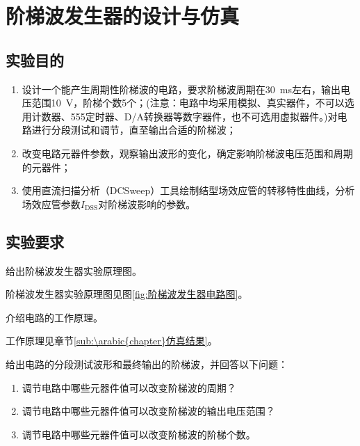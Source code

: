 \chapter{阶梯波发生器的设计与仿真}%
\label{cha:阶梯波发生器的设计与仿真}

\section{实验目的}%
\label{sec:\arabic{chapter}实验目的}

\begin{enumerate}
	\item 设计一个能产生周期性阶梯波的电路，要求阶梯波周期在\SI{30}{\ms}左右，输出电压范围\SI{10}{\V}，阶梯个数5个；(注意：电路中均采用模拟、真实器件，不可以选用计数器、555定时器、D/A转换器等数字器件，也不可选用虚拟器件。)对电路进行分段测试和调节，直至输出合适的阶梯波；
	\item 改变电路元器件参数，观察输出波形的变化，确定影响阶梯波电压范围和周期的元器件；
	\item 使用直流扫描分析（DCSweep）工具绘制结型场效应管的转移特性曲线，分析场效应管参数$ I_\mathrm{DSS} $对阶梯波影响的参数。
\end{enumerate}

\section{实验要求}%
\label{sec:\arabic{chapter}实验要求}

\begin{Exercise}
	给出阶梯波发生器实验原理图。
\end{Exercise}

\begin{Answer}
	阶梯波发生器实验原理图见图\ref{fig:阶梯波发生器电路图}。
\end{Answer}

\begin{Exercise}
	介绍电路的工作原理。
\end{Exercise}

\begin{Answer}
	工作原理见章节\ref{sub:\arabic{chapter}仿真结果}。
\end{Answer}

\begin{Exercise}
	给出电路的分段测试波形和最终输出的阶梯波，并回答以下问题：
	\begin{enumerate}
		\item 调节电路中哪些元器件值可以改变阶梯波的周期？
		\item 调节电路中哪些元器件值可以改变阶梯波的输出电压范围？
		\item 调节电路中哪些元器件值可以改变阶梯波的阶梯个数。
	\end{enumerate}
\end{Exercise}

